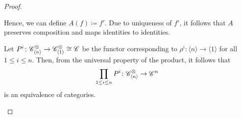 \begin{proof}
\begin{enumerate}[(M1)]
            \begin{center}
            \end{center}

            Hence, we can define $A(f) \coloneqq f'$. Due to uniqueness of $f'$,
            it follows that $A$ preserves composition and maps identities to
            identities.

            Let $P^i \colon \mathscr{C}^{\otimes}_{\langle n \rangle} \to \mathscr{C}^{\otimes}_{\langle 1
            \rangle} \cong \mathscr{C}$ be the functor corresponding to $\rho^i \colon
            \langle n \rangle \to \langle 1 \rangle$ for all $1 \leq i \leq n$.
            Then, from the universal property of the product, it follows that 
            \[
            \prod_{1 \leq i \leq n} P^i \colon \mathscr{C}^{\otimes}_{\langle n \rangle} \to \mathscr{C}^n
            \] is an equivalence of categories. 

            
            
            

            
        \end{enumerate}
    \end{proof}

